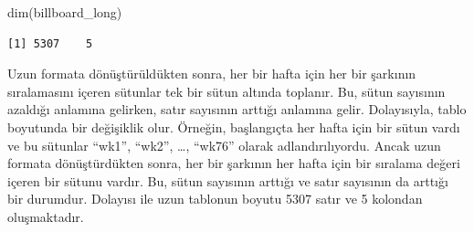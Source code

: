 \documentclass[
  letterpaper,
  DIV=11,
  numbers=noendperiod]{scrreprt}
\newenvironment{Shaded}{\begin{snugshade}}{\end{snugshade}}
\newcommand{\FunctionTok}[1]{\textcolor[rgb]{0.28,0.35,0.67}{#1}}
\newcommand{\NormalTok}[1]{\textcolor[rgb]{0.00,0.23,0.31}{#1}}
\begin{document}
\begin{Shaded}
\begin{Highlighting}[]
\FunctionTok{dim}\NormalTok{(billboard\_long)}
\end{Highlighting}
\end{Shaded}

\begin{verbatim}
[1] 5307    5
\end{verbatim}

Uzun formata dönüştürüldükten sonra, her bir hafta için her bir şarkının
sıralamasını içeren sütunlar tek bir sütun altında toplanır. Bu, sütun
sayısının azaldığı anlamına gelirken, satır sayısının arttığı anlamına
gelir. Dolayısıyla, tablo boyutunda bir değişiklik olur. Örneğin,
başlangıçta her hafta için bir sütun vardı ve bu sütunlar ``wk1'',
``wk2'', \ldots, ``wk76'' olarak adlandırılıyordu. Ancak uzun formata
dönüştürdükten sonra, her bir şarkının her hafta için bir sıralama
değeri içeren bir sütunu vardır. Bu, sütun sayısının arttığı ve satır
sayısının da arttığı bir durumdur. Dolayısı ile uzun tablonun boyutu
5307 satır ve 5 kolondan oluşmaktadır.
\end{document}
